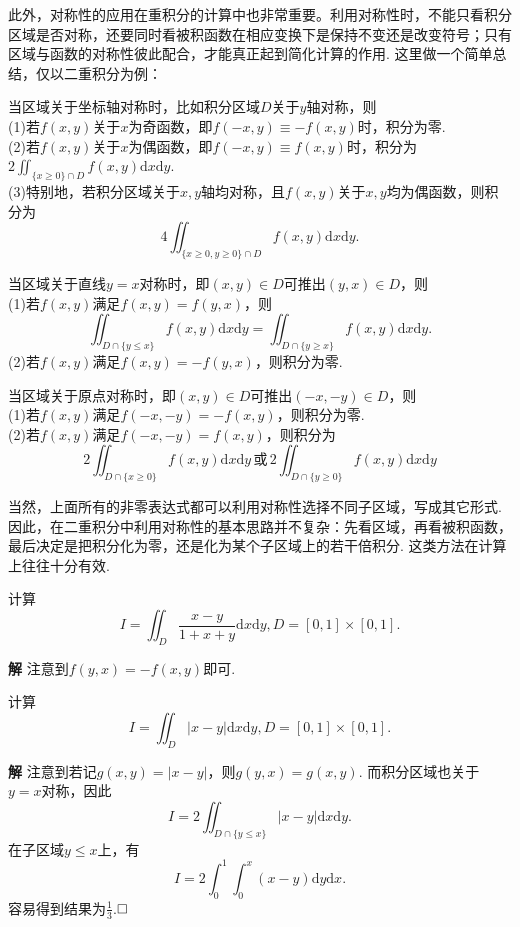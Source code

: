 \documentclass{ctexart}
\newenvironment{custom}[1]{\par\noindent \textbf{#1}\quad}{\par\vspace{1em}}
\begin{document}
此外，对称性的应用在重积分的计算中也非常重要。利用对称性时，不能只看积分区域是否对称，还要同时看被积函数在相应变换下是保持不变还是改变符号；只有区域与函数的对称性彼此配合，才能真正起到简化计算的作用. 这里做一个简单总结，仅以二重积分为例：

当区域关于坐标轴对称时，比如积分区域$D$关于$y$轴对称，则\\
(1)若$f(x,y)$关于$x$为奇函数，即$f(-x,y)\equiv -f(x,y)$时，积分为零.\\
(2)若$f(x,y)$关于$x$为偶函数，即$f(-x,y)\equiv f(x,y)$时，积分为$2\iint_{\{x\geqslant 0\}\cap D}{f(x,y)\mathrm{d}x\mathrm{d}y}$.\\
(3)特别地，若积分区域关于$x,y$轴均对称，且$f(x,y)$关于$x,y$均为偶函数，则积分为
$$4\iint_{\{x\geqslant 0,y\geqslant 0\}\cap D}{f(x,y)\mathrm{d}x\mathrm{d}y}.$$

当区域关于直线$y=x$对称时，即$(x,y)\in D$可推出$(y,x)\in D$，则\\
(1)若$f(x,y)$满足$f(x,y)=f(y,x)$，则
$$\iint_{D\cap\{y\leqslant x\}}{f(x,y)\mathrm{d}x\mathrm{d}y}=\iint_{D\cap\{y\geqslant x\}}{f(x,y)\mathrm{d}x\mathrm{d}y}.$$
(2)若$f(x,y)$满足$f(x,y)=-f(y,x)$，则积分为零.

当区域关于原点对称时，即$(x,y)\in D$可推出$(-x,-y)\in D$，则\\
(1)若$f(x,y)$满足$f(-x,-y)=-f(x,y)$，则积分为零.\\
(2)若$f(x,y)$满足$f(-x,-y)=f(x,y)$，则积分为
$$2\iint_{D\cap\{x\geqslant 0\}}{f(x,y)\mathrm{d}x\mathrm{d}y}\,\text{或}\,2\iint_{D\cap\{y\geqslant 0\}}{f(x,y)\mathrm{d}x\mathrm{d}y}$$

当然，上面所有的非零表达式都可以利用对称性选择不同子区域，写成其它形式. 因此，在二重积分中利用对称性的基本思路并不复杂：先看区域，再看被积函数，最后决定是把积分化为零，还是化为某个子区域上的若干倍积分. 这类方法在计算上往往十分有效.

\begin{example}
计算
$$I=\iint_{D}{\frac{x-y}{1+x+y}\mathrm{d}x\mathrm{d}y},D=[0,1]\times [0,1].$$
\end{example}

\begin{custom}{解}
注意到$f(y,x)=-f(x,y)$即可.
\end{custom}

\begin{example}
计算
$$I=\iint_{D}{|x-y|\mathrm{d}x\mathrm{d}y},D=[0,1]\times [0,1].$$
\end{example}

\begin{custom}{解}
注意到若记$g(x,y)=|x-y|$，则$g(y,x)=g(x,y)$. 而积分区域也关于$y=x$对称，因此
$$I=2\iint_{D\cap\{y\leqslant x\}}{|x-y|\mathrm{d}x\mathrm{d}y}.$$
在子区域$y\leqslant x$上，有
$$I=2\int_{0}^{1}{\int_{0}^{x}(x-y)\mathrm{d}y}\mathrm{d}x.$$
容易得到结果为$\frac{1}{3}$.$\hfill{\square}$
\end{custom}
\end{document}
